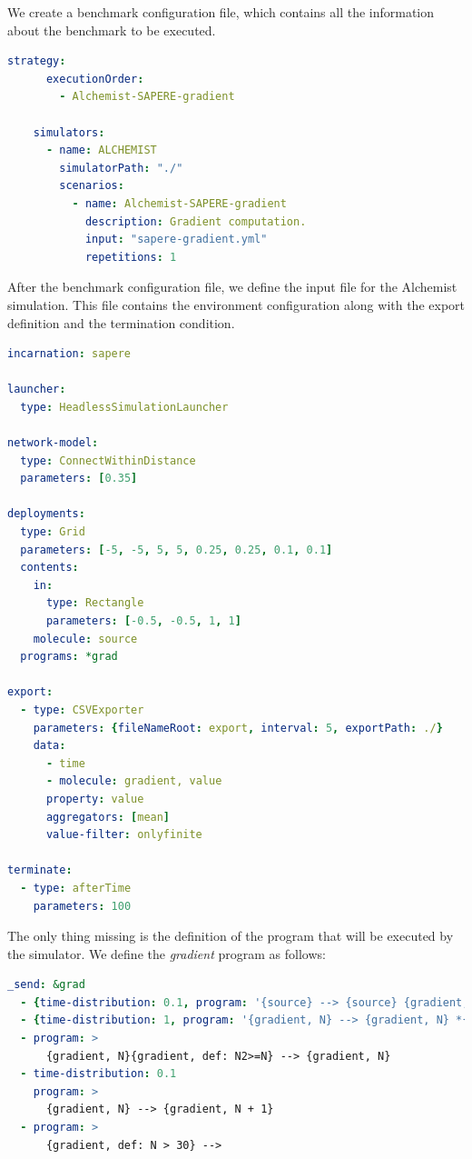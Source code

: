\documentclass[12pt,a4paper,openright,twoside]{book}
\begin{document}
We create a benchmark configuration file, which contains all the information about the benchmark to be executed.

\begin{lstlisting}[language=yaml, caption={Case of study: benchmark configuration file.}]
    strategy:
      executionOrder:
        - Alchemist-SAPERE-gradient
    
    simulators:
      - name: ALCHEMIST
        simulatorPath: "./"
        scenarios:
          - name: Alchemist-SAPERE-gradient
            description: Gradient computation.
            input: "sapere-gradient.yml"
            repetitions: 1
\end{lstlisting}

After the benchmark configuration file, we define the input file for the Alchemist simulation.
This file contains the environment configuration along with the export definition and the termination condition.

\begin{lstlisting}[language=yaml, caption={Case of study: Alchemist input file.}]
incarnation: sapere

launcher:
  type: HeadlessSimulationLauncher

network-model:
  type: ConnectWithinDistance
  parameters: [0.35]

deployments:
  type: Grid
  parameters: [-5, -5, 5, 5, 0.25, 0.25, 0.1, 0.1]
  contents:
    in:
      type: Rectangle
      parameters: [-0.5, -0.5, 1, 1]
    molecule: source
  programs: *grad
  
export:
  - type: CSVExporter
    parameters: {fileNameRoot: export, interval: 5, exportPath: ./}
    data: 
      - time
      - molecule: gradient, value
      property: value
      aggregators: [mean]
      value-filter: onlyfinite

terminate:
  - type: afterTime
    parameters: 100
\end{lstlisting}

The only thing missing is the definition of the program that will be executed by the simulator.
We define the \emph{gradient} program as follows:

\begin{lstlisting}[language=yaml, caption={Case of study: gradient program A.}]
_send: &grad
  - {time-distribution: 0.1, program: '{source} --> {source} {gradient, 0}'}
  - {time-distribution: 1, program: '{gradient, N} --> {gradient, N} *{gradient, N+#D}'}
  - program: >
      {gradient, N}{gradient, def: N2>=N} --> {gradient, N}
  - time-distribution: 0.1
    program: >
      {gradient, N} --> {gradient, N + 1}
  - program: >
      {gradient, def: N > 30} -->
    \end{lstlisting}
\end{document}

